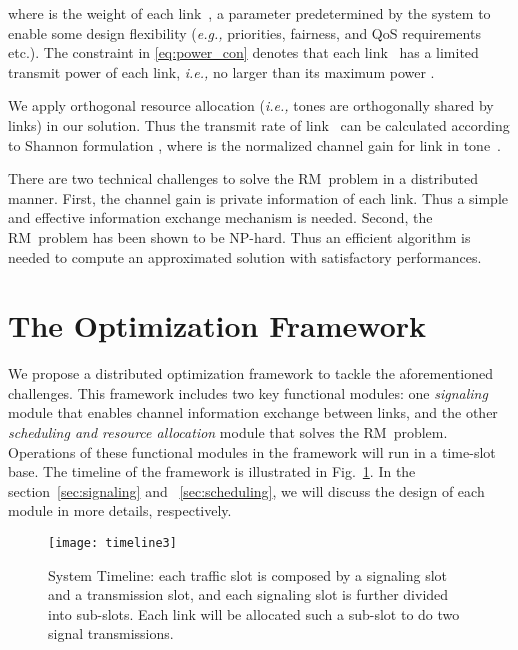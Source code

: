 \documentclass[conference]{IEEEtran}
\newcommand{\ie}{\emph{i.e., }}
\newcommand{\eg}{\emph{e.g., }}
\begin{document}
where  is the weight of each link~, a parameter predetermined by the system to enable some design flexibility (\eg priorities, fairness, and QoS requirements etc.). The constraint in \eqref{eq:power_con} denotes that each link~ has a limited transmit power of each link, \ie no larger than its maximum power .

We apply orthogonal resource allocation (\ie tones are orthogonally shared by links) in our solution. Thus the transmit rate of link~ can be calculated according to Shannon formulation , where  is the normalized channel gain for link  in tone~.



There are two technical challenges to  solve the RM~problem in a distributed manner. First, the channel gain  is private information of each link. Thus a simple and effective information exchange mechanism is needed.
Second, the RM~problem has been shown to be NP-hard\cite{luo2008dynamic}. Thus an efficient algorithm is needed to compute an approximated solution with satisfactory performances.


\section{The Optimization Framework}
We propose a distributed optimization framework to tackle the aforementioned challenges. This framework includes two key functional modules: one \emph{signaling} module that enables channel information exchange between links, and the other \emph{scheduling and resource allocation} module that solves the RM~problem.
Operations of these functional modules in the framework will run in a time-slot base. The timeline of the framework is illustrated in Fig.~\ref{fig:timeline}. In the section~\ref{sec:signaling} and ~\ref{sec:scheduling}, we will discuss the design of each module in more details, respectively.
















\begin{figure}[htb]
\centering
\texttt{[image: timeline3]}
\caption{System Timeline: each traffic slot is composed by a signaling slot and a transmission slot, and each signaling slot is further divided into  sub-slots. Each link will be allocated such a sub-slot to do two signal transmissions.}
\label{fig:timeline}
\end{figure}
\end{document}

